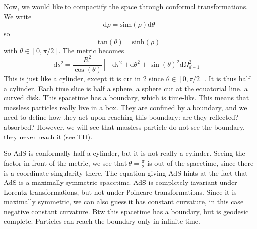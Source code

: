 \documentclass[a4paper]{book}
\theoremstyle{definition}
\theoremstyle{remark}
\begin{document}
Now, we would like to compactify the space through conformal transformations. We write 
\begin{equation}
    \text{d}\rho = \text{sinh}(\rho) \text{d}\theta 
\end{equation}
so 
\begin{equation}
    \text{tan}(\theta) = \text{sinh}(\rho)
\end{equation}
with $\theta \in [0, \pi/2]$. The metric becomes 
\begin{equation}
    \text{d}s^2 = \frac{R^2}{\cos (\theta)} \left[-\text{d}\tau^2 + \text{d}\theta^2 + \sin (\theta)^2 \text{d}\Omega_{d-1}^2\right]
\end{equation}
This is just like a cylinder, except it is cut in 2 since $\theta \in [0, \pi/2]$. It is thus half a cylinder. Each time slice is half a sphere, a sphere cut at the equatorial line, a curved disk. This spacetime has a boundary, which is time-like. This means that massless particles really live in a box. They are confined by a boundary, and we need to define how they act upon reaching this boundary: are they reflected? absorbed? However, we will see that massless particle do not see the boundary, they never reach it (see TD). \par \medskip 

So AdS is conformally half a cylinder, but it is not really a cylinder. Seeing the factor in front of the metric, we see that $\theta = \frac{\pi}{2}$ is out of the spacetime, since there is a coordinate singularity there. The equation giving AdS hints at the fact that AdS is a maximally symmetric spacetime. AdS is completely invariant under Lorentz transformations, but not under Poincare transformations. Since it is maximally symmetric, we can also guess it has constant curvature, in this case negative constant curvature. Btw this spacetime has a boundary, but is geodesic complete. Particles can reach the boundary only in infinite time. \par \medskip 
\end{document}
